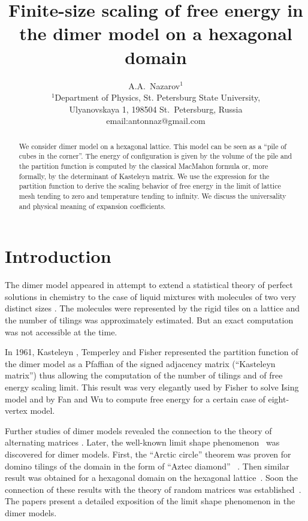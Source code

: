 \documentclass{article}
\begin{document}
\title{Finite-size scaling of free energy in the dimer model on a hexagonal domain}

\author{A.A.~Nazarov$^{1}$\\
{\small
  $^{1}$Department of Physics, St. Petersburg State University,} \\
{\small  Ulyanovskaya 1, 198504 St.~Petersburg, Russia}\\
\small{email:antonnaz@gmail.com}
}
\date{}
\maketitle

\begin{abstract}
  We consider dimer model on a hexagonal lattice. This model can be seen as a ``pile of cubes in the
  corner''. The energy of configuration is given by the volume of the pile and the partition
  function is computed by the classical MacMahon formula or, more formally, by the determinant of
  Kasteleyn matrix. We use the expression for the partition function to derive the scaling behavior
  of free energy in the limit of lattice mesh tending to zero and temperature tending to infinity.
  We discuss the universality and physical meaning of expansion coefficients.
\end{abstract}


\section*{Introduction}
\label{sec:introduction}
The dimer model appeared in attempt to extend a statistical theory of perfect solutions in chemistry
to the case of liquid mixtures with molecules of two very distinct sizes \cite{Fowler-1937}. The
molecules were represented by the rigid tiles on a lattice and the number of tilings was
approximately estimated. But an exact computation was not accessible at the time.

In 1961, Kasteleyn \cite{P.W-1961}, Temperley and Fisher \cite{doi:10.1080/14786436108243366}
represented the partition function of the dimer model as a Pfaffian of the signed adjacency matrix
(``Kasteleyn matrix'') thus allowing the computation of the number of tilings and of free energy scaling limit.
This result was very elegantly used by Fisher to solve Ising model \cite{fisher1966dimer} and by Fan
and Wu \cite{Fan-1970} to compute free energy for a certain case of eight-vertex model.

Further studies of dimer models revealed the connection to the theory of alternating matrices
\cite{elkies1992alternating1,elkies1992alternating2}. Later, the well-known limit shape
phenomenon~\cite{vershik1977kerov} was discovered for dimer models. First, the ``Arctic circle''
theorem was proven for domino tilings of the domain in the form of ``Aztec diamond''
~\cite{1998math......1068J}. Then similar result was obtained for a hexagonal domain on the
hexagonal lattice~\cite{cohn1998shape}. Soon the connection of these results with the theory of
random matrices was established~\cite{johansson2002non}. The papers
\cite{kenyon2006dimers,kenyon2009lectures} present a detailed exposition of the limit shape
phenomenon in the dimer models.
\end{document}
